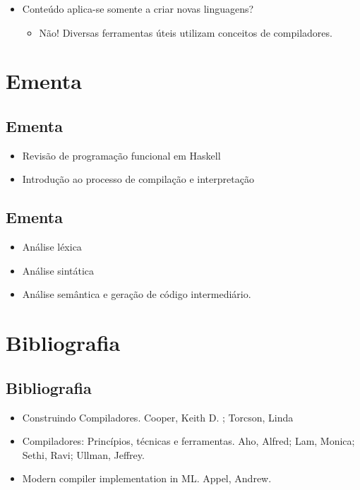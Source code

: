 \documentclass[11pt]{article}
\begin{document}
\begin{itemize}
\item Conteúdo aplica-se somente a criar novas linguagens?
\begin{itemize}
\item Não! Diversas ferramentas úteis utilizam conceitos de compiladores.
\end{itemize}
\end{itemize}
\section*{Ementa}
\label{sec:org24259c3}

\subsection*{Ementa}
\label{sec:org5538aed}

\begin{itemize}
\item Revisão de programação funcional em Haskell
\item Introdução ao processo de compilação e interpretação
\end{itemize}
\subsection*{Ementa}
\label{sec:org1540b9b}

\begin{itemize}
\item Análise léxica

\item Análise sintática

\item Análise semântica e geração de código intermediário.
\end{itemize}
\section*{Bibliografia}
\label{sec:orgaef4056}

\subsection*{Bibliografia}
\label{sec:org6487789}

\begin{itemize}
\item Construindo Compiladores. Cooper, Keith D. ; Torcson, Linda

\item Compiladores: Princípios, técnicas e ferramentas. Aho, Alfred; Lam, Monica; Sethi, Ravi; Ullman, Jeffrey.

\item Modern compiler implementation in ML. Appel, Andrew.
\end{itemize}
\end{document}
